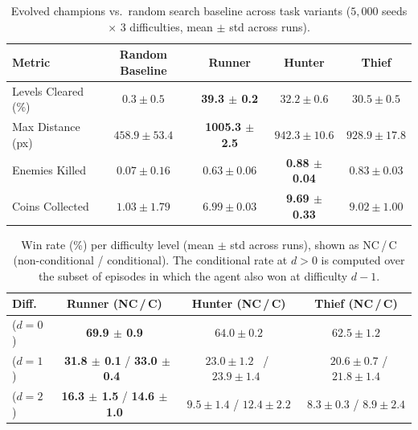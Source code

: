 \documentclass[runningheads]{llncs}
\begin{document}
\vspace{-0.4cm}
\begin{table}[htbp]
\caption{Evolved champions vs.\ random search baseline across task variants ($5{,}000$ seeds $\times$ 3 difficulties, mean $\pm$ std across runs).}
\vspace{-0.2cm}
\label{tab:comparison}
\centering
\begin{tabular}{lcccc}
\toprule
\textbf{Metric} & \textbf{Random Baseline} & \textbf{Runner} & \textbf{Hunter} & \textbf{Thief} \\
\midrule
Levels Cleared (\%) & $0.3 \pm 0.5$ & \textbf{39.3 $\pm$ 0.2} & $32.2 \pm 0.6$ & $30.5 \pm 0.5$ \\
Max Distance (px)   & $458.9 \pm 53.4$ & \textbf{1005.3 $\pm$ 2.5} & $942.3 \pm 10.6$ & $928.9 \pm 17.8$ \\
Enemies Killed      & $0.07 \pm 0.16$ & $0.63 \pm 0.06$  & \textbf{0.88 $\pm$ 0.04}  & $0.83 \pm 0.03$  \\
Coins Collected     & $1.03 \pm 1.79$ & $6.99 \pm 0.03$  & \textbf{9.69 $\pm$ 0.33}  & $9.02 \pm 1.00$  \\
\bottomrule
\end{tabular}
\end{table}
\vspace{-0.8cm}
\begin{table}[htbp]
\caption{Win rate (\%) per difficulty level (mean $\pm$ std across runs), shown as NC\,/\,C (non-conditional / conditional). The conditional rate at $d > 0$ is computed over the subset of episodes in which the agent also won at difficulty $d - 1$.}
\vspace{-0.2cm}
\label{tab:winrate_diff}
\centering
\begin{tabular}{lccc}
\toprule
\textbf{Diff.} & \textbf{Runner (NC\,/\,C)} & \textbf{Hunter (NC\,/\,C)} & \textbf{Thief (NC\,/\,C)} \\
\midrule
($d=0$) & \textbf{69.9 $\pm$ 0.9} & $64.0 \pm 0.2$ & $62.5 \pm 1.2$ \\
($d=1$) & ~\textbf{31.8 $\pm$ 0.1} / \textbf{33.0 $\pm$ 0.4}~ & ~$23.0 \pm 1.2$~ / ~$23.9 \pm 1.4$~ & ~$20.6 \pm 0.7$ / $21.8 \pm 1.4$ \\
($d=2$) & \textbf{16.3 $\pm$ 1.5} / \textbf{14.6 $\pm$ 1.0} & $9.5 \pm 1.4$  / $12.4 \pm 2.2$ & $8.3 \pm 0.3$  / $8.9 \pm 2.4$  \\
\bottomrule
\end{tabular}
\end{table}
\vspace{-0.4cm}
\end{document}
